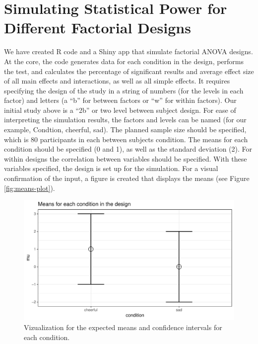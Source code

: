 \documentclass[,man,floatsintext]{apa6}
\begin{document}
\section{Simulating Statistical Power for Different Factorial
Designs}\label{simulating-statistical-power-for-different-factorial-designs}

We have created R code and a Shiny app that simulate factorial ANOVA
designs. At the core, the code generates data for each condition in the
design, performs the test, and calculates the percentage of significant
results and average effect size of all main effects and interactions, as
well as all simple effects. It requires specifying the design of the
study in a string of numbers (for the levels in each factor) and letters
(a \enquote{b} for between factors or \enquote{w} for within factors).
Our initial study above is a \enquote{2b} or two level between subject
design. For ease of interpreting the simulation results, the factors and
levels can be named (for our example, Condtion, cheerful, sad). The
planned sample size should be specified, which is 80 participants in
each between subjects condition. The means for each condition should be
specified (0 and 1), as well as the standard deviation (2). For within
designs the correlation between variables should be specified. With
these variables specified, the design is set up for the simulation. For
a visual confirmation of the input, a figure is created that displays
the means (see Figure \ref{fig:means-plot}).

\begin{figure}
\centering
\includegraphics{0.1_Simulation_Based_Power_Analysis_For_Factorial_ANOVA_Designs_files/figure-latex/mean-plot-1.pdf}
\caption{\label{fig:mean-plot}Vizualization for the expected means and
confidence intervals for each condition.}
\end{figure}
\end{document}
